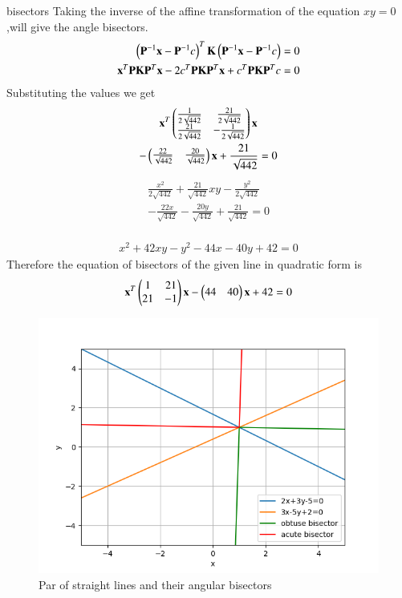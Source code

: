 {bisectors}
Taking the inverse of the affine transformation of the equation $xy=0$,will give the angle bisectors.
\begin{align}
    \left(\mathbf{P}^{-1}\mathbf{x}-\mathbf{P}^{-1}c\right)^T\mathbf{K}\left(\mathbf{P}^{-1}\mathbf{x}-\mathbf{P}^{-1}c\right)=0\\
    \mathbf{x}^T\mathbf{P}\mathbf{K}\mathbf{P}^T\mathbf{x}-2c^T\mathbf{P}\mathbf{K}\mathbf{P}^T\mathbf{x}+c^T\mathbf{P}\mathbf{K}\mathbf{P}^Tc=0
\end{align}
Substituting the values we get
    \begin{multline}
        \mathbf{x}^T\begin{pmatrix}\frac{1}{2\sqrt{442}}&\frac{21}{2\sqrt{442}}\\\frac{21}{2\sqrt{442}}&-\frac{1}{2\sqrt{442}}\end{pmatrix}\mathbf{x}\\
        -\begin{pmatrix}\frac{22}{\sqrt{442}}&\frac{20}{\sqrt{442}}\end{pmatrix}\mathbf{x}+\frac{21}{\sqrt{442}}=0
    \end{multline}
    \begin{multline}
        \frac{x^2}{2\sqrt{442}}+\frac{21}{\sqrt{442}}xy-\frac{y^2}{2\sqrt{442}}\\
        -\frac{22x}{\sqrt{442}}-\frac{20y}{\sqrt{442}}+\frac{21}{\sqrt{442}}=0
    \end{multline}\\
\begin{align}
    x^2+42xy-y^2-44x-40y+42=0
\end{align}
Therefore the equation of bisectors of the given line in quadratic form is
\begin{align}
    \mathbf{x}^T\begin{pmatrix}1&21\\21&-1\end{pmatrix}\mathbf{x}-\begin{pmatrix}44&40\end{pmatrix}\mathbf{x}+42=0
\end{align}
\begin{figure}[t]
    \centering
    \includegraphics[width=\columnwidth]{./solutions/2/6/22/Fig2_a5.png}
    \caption{Par of straight lines and their angular bisectors}
    \label{eq:solutions/2/6/22/fig:my_label}
\end{figure}
